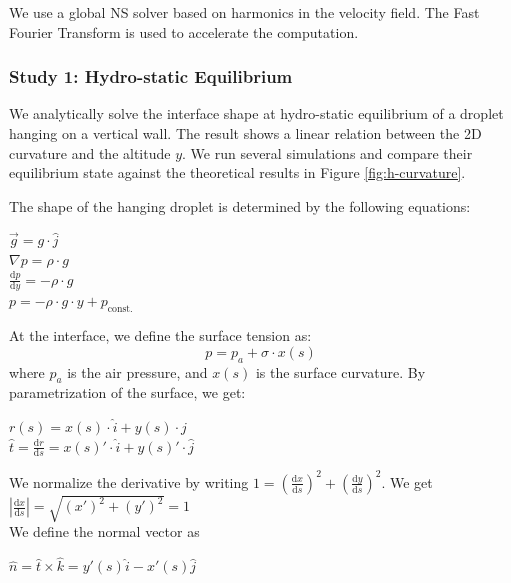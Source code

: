 \documentclass{jfm}
\begin{document}
        We use a global NS solver based on harmonics in the velocity field. The Fast Fourier Transform is used to accelerate the computation. 
        
    \subsubsection {Study 1: Hydro-static Equilibrium}
        We analytically solve the interface shape at hydro-static equilibrium of a droplet hanging on a vertical wall. The result shows a linear relation between the 2D curvature and the altitude $y$. We run several simulations and compare their equilibrium state against the theoretical results in Figure \ref{fig:h-curvature}. 

        The shape of the hanging droplet is determined by the following equations:\\
        \begin{center}
        $\vec{g}=g\cdot\hat{j}$\\
        $\nabla{p}=\rho\cdot{g}$\\
        $\frac{\mathrm{d}p}{\mathrm{d}y}=-\rho\cdot{g}$\\
        $p=-\rho\cdot{g}\cdot{y}+p_{\text{const.}}$
        \end{center}
        At the interface, we define the surface tension as:\\
        \begin{equation}
        p=p_{a}+\sigma\cdot{x(s)}
        \label{eqn:pressure}
        \end{equation}
        where $p_{a}$ is the air pressure, and $x(s)$ is the surface curvature. By parametrization of the surface, we get:\\
        \begin{center}
        $r(s)=x(s)\cdot\hat{i}+y(s)\cdot\hat{j}$\\
        $\hat{t}=\frac{\mathrm{d}r}{\mathrm{d}s}=x(s)'\cdot\hat{i}+y(s)'\cdot\hat{j}$
        \end{center}
        We normalize the derivative by writing $1=\left(\frac{\mathrm{d}x}{\mathrm{d}s}\right)^2+\left(\frac{\mathrm{d}y}{\mathrm{d}s}\right)^2$. We get $\left|\frac{\mathrm{d}x}{\mathrm{d}s}\right|=\sqrt{(x')^2+(y')^2}=1$\\
        We define the normal vector as\\
        \begin{center}
        $\hat{n}=\hat{t}\times\hat{k}=y'(s)\hat{i}-x'(s)\hat{j}$
        \end{center}
\end{document}
